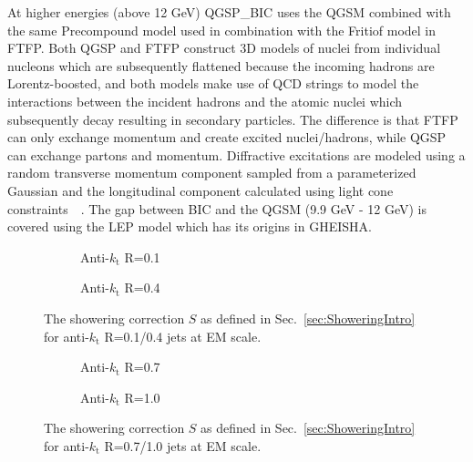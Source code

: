 At higher energies (above 12 GeV) QGSP\_BIC uses the \gls{QGSM} combined with the same Precompound model used in combination with the Fritiof model in FTFP.  
Both QGSP and FTFP construct 3D models of nuclei from individual nucleons which are subsequently flattened because the incoming hadrons are Lorentz-boosted, and both models make use of QCD strings to model the interactions between the incident hadrons and the atomic nuclei which subsequently decay resulting in secondary particles.  
The difference is that FTFP can only exchange momentum and create excited nuclei/hadrons, while QGSP can exchange partons and momentum.  
Diffractive excitations are modeled using a random transverse momentum component sampled from a parameterized Gaussian and the longitudinal component calculated using light cone constraints~\cite{GEANT4}~\cite{GEANT4Man}.   
The gap between BIC and the QGSM (9.9 GeV - 12 GeV) is covered using the \gls{LEP} model which has its origins in {\sc GHEISHA}\cite{Fesefeldt:1985yw}.  

\begin{figure}[!ht]
  \centering
  \begin{subfigure}{.5\textwidth}
    \centering
    \caption{Anti-$k_\mathrm{t}$ R=0.1}
  \end{subfigure}%
  \begin{subfigure}{.5\textwidth}  \centering
    \caption{Anti-$k_\mathrm{t}$ R=0.4}
  \end{subfigure}
  \caption[Showering correction using anti-$k_\mathrm{t}$ R=0.1/0.4 jets]
{\small The showering correction $S$ as defined in Sec.~\ref{sec:ShoweringIntro} for anti-$k_\mathrm{t}$ R=0.1/0.4 jets at EM scale.  }
  \label{Fig:Showering_1-4}
\end{figure}

\begin{figure}[!ht]
  \centering
  \begin{subfigure}{.5\textwidth}
    \centering
    \caption{Anti-$k_\mathrm{t}$ R=0.7}
  \end{subfigure}%
  \begin{subfigure}{.5\textwidth}  \centering
    \caption{Anti-$k_\mathrm{t}$ R=1.0}
  \end{subfigure}
  \caption[Showering correction using anti-$k_\mathrm{t}$ R=0.7/1.0 jets]
{\small The showering correction $S$ as defined in Sec.~\ref{sec:ShoweringIntro} for anti-$k_\mathrm{t}$ R=0.7/1.0 jets at EM scale.  }
  \label{Fig:Showering_7-10}
\end{figure}

